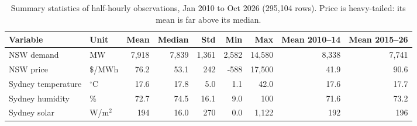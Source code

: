\begin{table}[t]
\centering
\small
\begin{tabular}{llrrrrrrr}
\toprule
Variable & Unit & Mean & Median & Std & Min & Max & Mean 2010--14 & Mean 2015--26 \\
\midrule
NSW demand & MW & 7,918 & 7,839 & 1,361 & 2,582 & 14,580 & 8,338 & 7,741 \\
NSW price & \$/MWh & 76.2 & 53.1 & 242 & -588 & 17,500 & 41.9 & 90.6 \\
Sydney temperature & $^\circ$C & 17.6 & 17.8 & 5.0 & 1.1 & 42.0 & 17.6 & 17.7 \\
Sydney humidity & \% & 72.7 & 74.5 & 16.1 & 9.0 & 100 & 71.6 & 73.2 \\
Sydney solar & W/m$^2$ & 194 & 16.0 & 270 & 0.0 & 1,122 & 192 & 196 \\
\bottomrule
\end{tabular}
\caption{Summary statistics of half-hourly observations, Jan 2010 to Oct 2026 (295{,}104 rows). Price is heavy-tailed: its mean is far above its median.}
\label{tab:summary}
\end{table}
